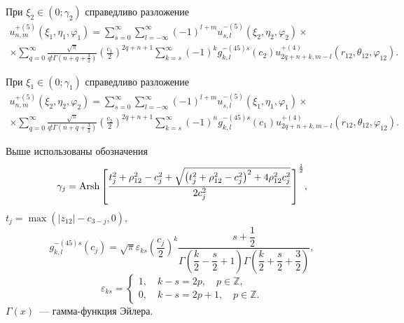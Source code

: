 \begin{theorem}
При ${\xi _2} \in \left( {0;{\gamma _2}} \right)$ справедливо разложение
\begin{multline}\label{eq:1:22}
u_{n,m}^{ + (5)}\left( {{\xi _1},{\eta _1},{\varphi _1}} \right) = \sum\limits_{s = 0}^\infty  {\sum\limits_{l =  - \infty }^\infty  {{{( - 1)}^{l + m}}} } u_{s,l}^{ - (5)}\left( {{\xi _2},{\eta _2},{\varphi _2}} \right) \times \\
\times \sum\limits_{q = 0}^\infty  {\frac{{\sqrt \pi  }}{{q!\Gamma \left( {n + q + \frac{3}{2}} \right)}}} {\left( {\frac{{{c_1}}}{2}} \right)^{2q + n + 1}}\sum\limits_{k = s}^\infty  {{{( - 1)}^k}} g_{k,l}^{ - (45)s}({c_2}) u_{2q + n + k,m - l}^{ + (4)}\left( {{r_{12}},{\theta _{12}},{\varphi _{12}}} \right).
\end{multline}

При ${\xi _1} \in \left( {0;{\gamma _1}} \right)$ справедливо разложение
\begin{multline}\label{eq:1:23}
u_{n,m}^{ + (5)}\left( {{\xi _2},{\eta _2},{\varphi _2}} \right) = \sum\limits_{s = 0}^\infty  {\sum\limits_{l =  - \infty }^\infty  {{{( - 1)}^{l + m}}} } u_{s,l}^{ - (5)}\left( {{\xi _1},{\eta _1},{\varphi _1}} \right) \times \\
\times \sum\limits_{q = 0}^\infty  {\frac{{\sqrt \pi  }}{{q!\Gamma \left( {n + q + \frac{3}{2}} \right)}}} {\left( {\frac{{{c_2}}}{2}} \right)^{2q + n + 1}}\sum\limits_{k = s}^\infty  {{{( - 1)}^n}} g_{k,l}^{ - (45)s}({c_1}) u_{2q + n + k,m - l}^{ + (4)}\left( {{r_{12}},{\theta _{12}},{\varphi _{12}}} \right).
\end{multline}

Выше использованы обозначения
\begin{equation}\label{eq:1:24}
{\gamma _j} = {\rm{Arsh}}{\mkern 1mu} {\kern 1pt} {\left[ {\frac{{t^2_j + \rho _{12}^2 - c_j^2 + \sqrt {\left( {t^2_j + \rho _{12}^2 - c_j^2} \right)^2 + 4\rho _{12}^2c_j^2} }}{{2c_j^2}}} \right]^{\frac{1}{2}}},
\end{equation}
$t_j=\max(|z_{12}|-c_{3-j},0)$,
\begin{equation}\label{eq:1:25}
g_{k,l}^{ - (45)s}({c_j}) = \sqrt \pi  {\varepsilon _{ks}}{\left( {\dfrac{{{c_j}}}{2}} \right)^k}\dfrac{{s + \dfrac{1}{2}}}{{\Gamma \left( {\dfrac{k}{2} - \dfrac{s}{2} + 1} \right)\Gamma \left( {\dfrac{k}{2} + \dfrac{s}{2} + \dfrac{3}{2}} \right)}},
\end{equation}
\begin{equation}\label{eq:1:26}
\varepsilon_{ks}=\left\{ {\begin{array}{*{20}{l}}
{1,\quad k - s = 2p,\quad p \in \mathbb{Z},}\\
{0,\quad k - s = 2p + 1,\quad p \in \mathbb{Z}.}
\end{array}} \right.
\end{equation}
$\Gamma (x)$~--- гамма-функция Эйлера.
\end{theorem}

